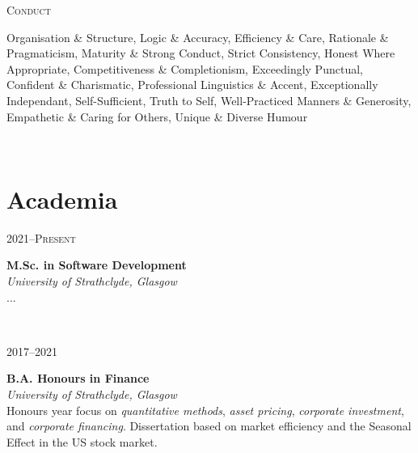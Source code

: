 \documentclass[11pt, english]{article}
\begin{document}
{\begin{minipage}[t]{.15\linewidth}
        \hfill                    
	\textsc{Conduct}
\end{minipage}                                        
\hfill\vline\hfill                                   
\begin{minipage}[t]{.80\linewidth}                   	
	Organisation \& Structure, Logic \& Accuracy, Efficiency \& Care, Rationale \& Pragmaticism, Maturity \& Strong Conduct, Strict Consistency, Honest Where Appropriate, Competitiveness \& Completionism, Exceedingly Punctual, Confident \& Charismatic, Professional Linguistics \& Accent, Exceptionally Independant, Self-Sufficient, Truth to Self, Well-Practiced Manners \& Generosity, Empathetic \& Caring for Others, Unique \& Diverse Humour
\end{minipage}\\                                                                      

\section{Academia}

\begin{minipage}[t]{.15\linewidth}
	\hfill 
	\textsc{2021--Present}
\end{minipage}
\hfill\vline\hfill
\begin{minipage}[t]{.80\linewidth}
	\textbf{M.Sc. in Software Development}\\
	\textit{University of Strathclyde, Glasgow}\\ 
	...
\end{minipage}\\

\begin{minipage}[t]{.15\linewidth}
	\hfill 
	\textsc{2017--2021}
\end{minipage}
\hfill\vline\hfill
\begin{minipage}[t]{.80\linewidth}
	\textbf{B.A. Honours in Finance}\\
	\textit{University of Strathclyde, Glasgow}\\ 
	Honours year focus on \textit{quantitative methods}, \textit{asset pricing}, \textit{corporate investment}, and \textit{corporate financing}. Dissertation based on market efficiency and the Seasonal Effect in the US stock market.
\end{minipage}\\

}
\end{document}

